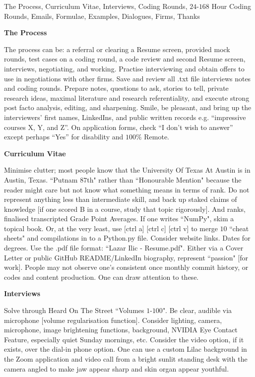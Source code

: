 The Process, Curriculum Vitae, Interviews, Coding Rounds, $24$-$168$ Hour Coding Rounds, Emails, Formulae, Examples, Dialogues, Firms, Thanks

\textbf{The Process}

The process can be: a referral or clearing a Resume screen, provided mock rounds, test cases on a coding round, a code review and second Resume screen, interviews, negotiating, and working. Practise interviewing and obtain offers to use in negotiations with other firms. Save and review all .txt file interviews notes and coding rounds. Prepare notes, questions to ask, stories to tell, private research ideas, maximal literature and research referentiality, and execute strong post facto analysis, editing, and sharpening. Smile, be pleasant, and bring up the interviewers' first names, LinkedIns, and public written records e.g. ``impressive courses X, Y, and Z''. On application forms, check ``I don't wish to answer'' except perhaps ``Yes'' for disability and $100\%$ Remote.

\textbf{Curriculum Vitae}

Minimise clutter; most people know that the University Of Texas At Austin is in Austin, Texas. ``Putnam $87$th" rather than ``Honourable Mention" because the reader might care but not know what something means in terms of rank. Do not represent anything less than intermediate skill, and back up staked claims of knowledge [if one scored B in a course, study that topic rigorously]. And ranks, finalised transcripted Grade Point Averages. If one writes ``NumPy", skim a topical book. Or, at the very least, use [ctrl a] [ctrl c] [ctrl v] to merge $10$ ``cheat sheets" and compilations in to a Python.py file. Consider website links. Dates for degrees. Use the .pdf file format: ``Lazar Ilic - Resume.pdf". Either via a Cover Letter or public GitHub README/LinkedIn biography, represent ``passion" [for work]. People may not observe one's consistent once monthly commit history, or codes and content production. One can draw attention to these.

\textbf{Interviews}

Solve through Heard On The Street ``Volumes $1$-$100$". Be clear, audible via microphone [volume regularisation function]. Consider lighting, camera, microphone, image brightening functions, background, NVIDIA Eye Contact Feature, especially quiet Sunday mornings, etc. Consider the video option, if it exists, over the dial-in phone option. One can use a custom Lilac background in the Zoom application and video call from a bright sunlit standing desk with the camera angled to make jaw appear sharp and skin organ appear youthful.

